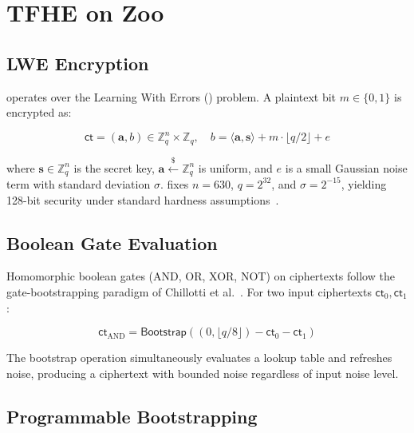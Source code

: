 \section{TFHE on Zoo}

\label{sec:tfhe}

\subsection{LWE Encryption}

\TFHE{} operates over the Learning With Errors (\LWE{}) problem. A plaintext bit $m \in \{0,1\}$ is encrypted as:

\begin{equation}
  \mathsf{ct} = (\mathbf{a}, b) \in \mathbb{Z}_q^n \times \mathbb{Z}_q, \quad b = \langle \mathbf{a}, \mathbf{s} \rangle + m \cdot \lfloor q/2 \rfloor + e
\end{equation}

\noindent where $\mathbf{s} \in \mathbb{Z}_q^n$ is the secret key, $\mathbf{a} \xleftarrow{\$} \mathbb{Z}_q^n$ is uniform, and $e$ is a small Gaussian noise term with standard deviation $\sigma$. \Zoo{} fixes $n = 630$, $q = 2^{32}$, and $\sigma = 2^{-15}$, yielding 128-bit security under standard \LWE{} hardness assumptions~\cite{albrecht2015lwe}.

\subsection{Boolean Gate Evaluation}

Homomorphic boolean gates (AND, OR, XOR, NOT) on \LWE{} ciphertexts follow the gate-bootstrapping paradigm of Chillotti et al.~\cite{chillotti2020tfhe}. For two input ciphertexts $\mathsf{ct}_0, \mathsf{ct}_1$:

\begin{equation}
  \mathsf{ct}_{\mathrm{AND}} = \mathsf{Bootstrap}\!\left( (0, \lfloor q/8 \rfloor) - \mathsf{ct}_0 - \mathsf{ct}_1 \right)
\end{equation}

The bootstrap operation simultaneously evaluates a lookup table and refreshes noise, producing a ciphertext with bounded noise regardless of input noise level.

\subsection{Programmable Bootstrapping}

